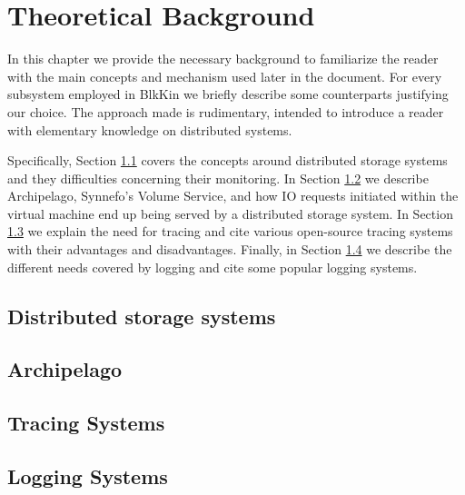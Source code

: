 \chapter{Theoretical Background}\label{ch:bkg}

In this chapter we provide the necessary background to familiarize the reader
with the main concepts and mechanism used later in the document. For every
subsystem employed in BlkKin we briefly describe some counterparts justifying
our choice. The approach made is rudimentary, intended to introduce a reader
with elementary knowledge on distributed systems.

Specifically, Section \ref{sec:storage} covers the concepts around distributed
storage systems and they difficulties concerning their monitoring.  In Section
\ref{sec:archip-bkg} we describe Archipelago, Synnefo's Volume Service, and how
IO requests initiated within the virtual machine end up being served by a
distributed storage system. In Section \ref{sec:tracing-bkg} we explain the need
for tracing and cite various open-source tracing systems  with their advantages
and disadvantages. Finally, in Section \ref{sec:logging-bkg} we describe the
different needs covered by logging and cite some popular logging systems.


\section{Distributed storage systems}\label{sec:storage}

\section{Archipelago}\label{sec:archip-bkg}

\section{Tracing Systems}\label{sec:tracing-bkg}

\section{Logging Systems}\label{sec:logging-bkg}
